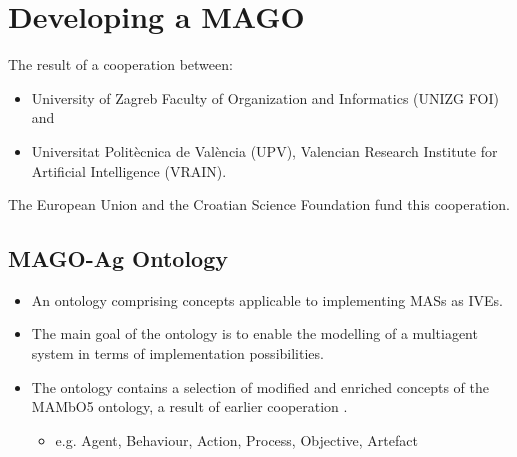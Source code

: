 \section{Developing a \acf{MAGO}}

\begin{frame}{\insertsection}
    The result of a cooperation between:
        \begin{itemize}
            \item University of Zagreb Faculty of Organization and Informatics (\alert{UNIZG FOI}) and
            \item Universitat Politècnica de València (\alert{UPV}), Valencian Research Institute for Artificial Intelligence (\alert{VRAIN}).
        \end{itemize}

    \medskip
    The European Union and the Croatian Science Foundation fund this cooperation.
\end{frame}

\begin{frame}{\insertsection}
\end{frame}



\subsection{MAGO-Ag Ontology}

\begin{frame}{\insertsubsection}
    \begin{itemize}
        \item An ontology comprising concepts applicable to \alert{implementing \acp{MAS} as \acp{IVE}}.

        \item The \alert{main goal} of the ontology is to enable the modelling of a multiagent system in terms of implementation possibilities.

        \item The ontology contains a selection of modified and enriched concepts of the MAMbO5 ontology, a result of earlier cooperation \cite{okresaduric2019MAMbO5NewOntology}.

        \begin{itemize}
            \item e.g. Agent, Behaviour, Action, Process, Objective, Artefact
        \end{itemize}
    \end{itemize}
\end{frame}

